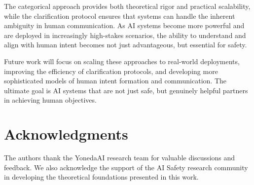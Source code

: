 \documentclass[12pt]{article}
\begin{document}
The categorical approach provides both theoretical rigor and practical scalability, while the clarification protocol ensures that systems can handle the inherent ambiguity in human communication. As AI systems become more powerful and are deployed in increasingly high-stakes scenarios, the ability to understand and align with human intent becomes not just advantageous, but essential for safety.

Future work will focus on scaling these approaches to real-world deployments, improving the efficiency of clarification protocols, and developing more sophisticated models of human intent formation and communication. The ultimate goal is AI systems that are not just safe, but genuinely helpful partners in achieving human objectives.

\section*{Acknowledgments}

The authors thank the YonedaAI research team for valuable discussions and feedback. We also acknowledge the support of the AI Safety research community in developing the theoretical foundations presented in this work.
\end{document}
